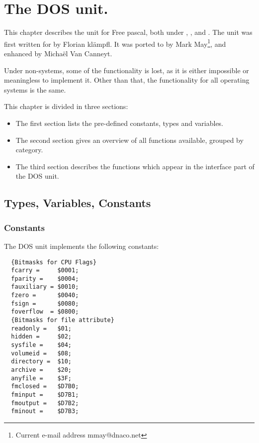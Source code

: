 %
%
%
%
%
\chapter{The DOS unit.}

This chapter describes the  unit for Free pascal, both under
\dos, \ostwo, \windows and \linux. 
The unit was first written for \dos by Florian kl\"ampfl. It was ported to 
\linux by Mark May\footnote{Current e-mail address \textsf{mmay@dnaco.net}}, 
and enhanced by Micha\"el Van Canneyt.

Under non-\dos systems, some of the functionality is lost, as it is either impossible 
or meaningless to implement it. Other than that, the functionality for all 
operating systems is the same.

This chapter is divided in three sections:
\begin{itemize}
\item The first section lists the pre-defined constants, types and variables. 
\item The second section gives an overview of all functions available,
grouped by category.
\item The third section describes the functions which appear in the
interface part of the DOS unit.
\end{itemize}

\section{Types, Variables, Constants}
\subsection {Constants}
The DOS unit implements the following constants:
\begin{verbatim}
  {Bitmasks for CPU Flags}
  fcarry =     $0001;
  fparity =    $0004;
  fauxiliary = $0010;
  fzero =      $0040;
  fsign =      $0080;
  foverflow  = $0800;
  {Bitmasks for file attribute}
  readonly =   $01;
  hidden =     $02;
  sysfile =    $04;
  volumeid =   $08;
  directory =  $10;
  archive =    $20;
  anyfile =    $3F;
  fmclosed =   $D7B0;
  fminput =    $D7B1;
  fmoutput =   $D7B2;
  fminout =    $D7B3;
\end{verbatim}
